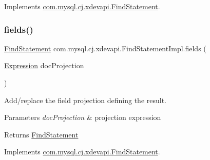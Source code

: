 Implements \mbox{\hyperlink{interfacecom_1_1mysql_1_1cj_1_1xdevapi_1_1_find_statement_a31dcef3b4852a5eb361a03b549eddeaf}{com.\+mysql.\+cj.\+xdevapi.\+Find\+Statement}}.

\mbox{\label{classcom_1_1mysql_1_1cj_1_1xdevapi_1_1_find_statement_impl_a52d3c488bb46564fdab7629781d6c99b}} 
\subsubsection{\texorpdfstring{fields()}{fields()}\hspace{0.1cm}{\footnotesize\ttfamily [2/2]}}
{\footnotesize\ttfamily \mbox{\hyperlink{interfacecom_1_1mysql_1_1cj_1_1xdevapi_1_1_find_statement}{Find\+Statement}} com.\+mysql.\+cj.\+xdevapi.\+Find\+Statement\+Impl.\+fields (\begin{DoxyParamCaption}\item[{\mbox{\hyperlink{classcom_1_1mysql_1_1cj_1_1xdevapi_1_1_expression}{Expression}}}]{doc\+Projection }\end{DoxyParamCaption})}

Add/replace the field projection defining the result.


\begin{DoxyParams}{Parameters}
{\em doc\+Projection} & projection expression \\
\hline
\end{DoxyParams}
\begin{DoxyReturn}{Returns}
\mbox{\hyperlink{interfacecom_1_1mysql_1_1cj_1_1xdevapi_1_1_find_statement}{Find\+Statement}} 
\end{DoxyReturn}


Implements \mbox{\hyperlink{interfacecom_1_1mysql_1_1cj_1_1xdevapi_1_1_find_statement_ad4cbafb2eb15a77355ddcacf12188ba2}{com.\+mysql.\+cj.\+xdevapi.\+Find\+Statement}}.

\mbox{\label{classcom_1_1mysql_1_1cj_1_1xdevapi_1_1_find_statement_impl_ad75d9465a8dec5c2340ab8b25678f97d}} 
